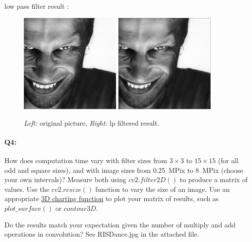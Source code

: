 	low pass filter result : 
	\begin{figure}[h!]
	    \centering
	    \includegraphics[width=5cm]{aphext.jpg}
	    \includegraphics[width=5cm]{aphext_output_blur.jpg}
	    \caption{\emph{Left:} original picture, \emph{Right:} lp filtered result.}
	    \label{fig:result2}
	\end{figure}
	
	\pagebreak
	\paragraph{Q4:} How does computation time vary with filter sizes from $3\times3$ to $15\times15$ (for all odd and square sizes), and with image sizes from 0.25~MPix to 8~MPix (choose your own intervals)? Measure both using \href{https://docs.opencv.org/4.5.0/d4/d86/group__imgproc__filter.html#ga27c049795ce870216ddfb366086b5a04}{$cv2.filter2D()$} to produce a matrix of values. Use the \href{https://docs.opencv.org/4.5.3/da/d54/group__imgproc__transform.html#ga47a974309e9102f5f08231edc7e7529d}{$cv2.resize()$} function to vary the size of an image.
	Use an appropriate \href{https://jakevdp.github.io/PythonDataScienceHandbook/04.12-three-dimensional-plotting.html#Three-dimensional-Contour-Plots}{3D charting function} to plot your matrix of results, such as $plot\_surface()$ or $contour3D$.
	
	Do the results match your expectation given the number of multiply and add operations in convolution?
	See RISDance.jpg in the attached file.
	
